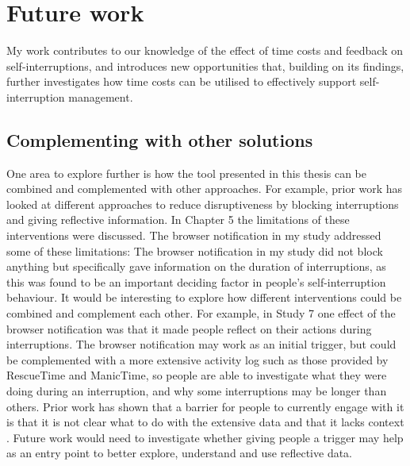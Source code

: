 \section{Future work}
My work contributes to our knowledge of the effect of time costs and feedback on self-interruptions, and introduces new opportunities that, building on its findings, further investigates how time costs can be utilised to effectively support self-interruption management.



\subsection{Complementing with other solutions}
One area to explore further is how the tool presented in this thesis can be combined and complemented with other approaches. For example, prior work has looked at different approaches to reduce disruptiveness by blocking interruptions and giving reflective information. In Chapter 5 the limitations of these interventions were discussed. The browser notification in my study addressed some of these limitations: The browser notification in my study did not block anything but specifically gave information on the duration of interruptions, as this was found to be an important deciding factor in people's self-interruption behaviour. It would be interesting to explore how different interventions could be combined and complement each other. For example, in Study 7 one effect of the browser notification was that it made people reflect on their actions during interruptions. The browser notification may work as an initial trigger, but could be complemented with a more extensive activity log such as those provided by RescueTime and ManicTime, so people are able to investigate what they were doing during an interruption, and why some interruptions may be longer than others. Prior work has shown that a barrier for people to currently engage with it is that it is not clear what to do with the extensive data and that it lacks context \citep{Collins2014}. Future work would need to investigate whether giving people a trigger may help as an entry point to better explore, understand and use  reflective data. 

